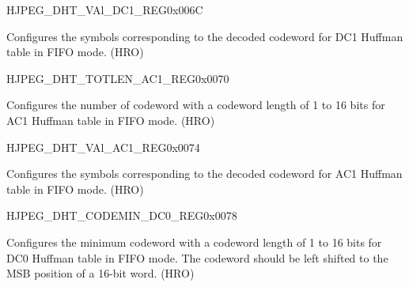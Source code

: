 \begin{register}{H}{JPEG\_DHT\_VAl\_DC1\_REG}{0x006C}\label{regdesc:JPEGDHTVALDC1REG}
%
\regnewline%
\begin{regdesc}\begin{reglist}
\label{fielddesc:JPEGDHTVALDC1}\item [JPEG\_DHT\_VAL\_DC1] Configures the symbols corresponding to the decoded codeword for DC1 Huffman table in FIFO mode. (HRO)
\end{reglist}\end{regdesc}
\end{register}


\begin{register}{H}{JPEG\_DHT\_TOTLEN\_AC1\_REG}{0x0070}\label{regdesc:JPEGDHTTOTLENAC1REG}
%
\regnewline%
\begin{regdesc}\begin{reglist}
\label{fielddesc:JPEGDHTTOTLENAC1}\item [JPEG\_DHT\_TOTLEN\_AC1] Configures the number of codeword with a codeword length of 1 to 16 bits for AC1 Huffman table in FIFO mode. (HRO)
\end{reglist}\end{regdesc}
\end{register}


\begin{register}{H}{JPEG\_DHT\_VAl\_AC1\_REG}{0x0074}\label{regdesc:JPEGDHTVALAC1REG}
%
\regnewline%
\begin{regdesc}\begin{reglist}
\label{fielddesc:JPEGDHTVALAC1}\item [JPEG\_DHT\_VAL\_AC1] Configures the symbols corresponding to the decoded codeword for AC1 Huffman table in FIFO mode. (HRO)
\end{reglist}\end{regdesc}
\end{register}


\begin{register}{H}{JPEG\_DHT\_CODEMIN\_DC0\_REG}{0x0078}\label{regdesc:JPEGDHTCODEMINDC0REG}
%
\regnewline%
\begin{regdesc}\begin{reglist}
\label{fielddesc:JPEGDHTCODEMINDC0}\item [JPEG\_DHT\_CODEMIN\_DC0] Configures the minimum codeword with a codeword length of 1 to 16 bits for DC0 Huffman table in FIFO mode. The codeword should be left shifted to the MSB position of a 16-bit word. (HRO)
\end{reglist}\end{regdesc}
\end{register}


